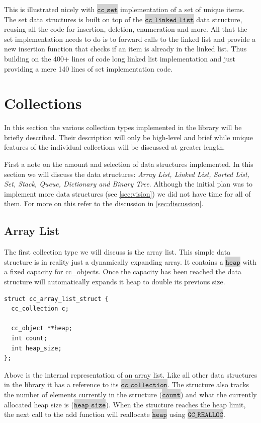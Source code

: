 \documentclass[table]{ituthesis}
\newcommand{\highlight}[1]{\colorbox{lightGray}{$\displaystyle \texttt{#1}$}}
\begin{document}
This is illustrated nicely with \highlight{cc\_set} implementation of a set of unique items. The set data structures is built on top of the \highlight{cc\_linked\_list} data structure, reusing all the code for insertion, deletion, enumeration and more. All that the set implementation needs to do is to forward calls to the linked list and provide a new insertion function that checks if an item is already in the linked list. Thus building on the 400+ lines of code long linked list implementation and just providing a mere 140 lines of set implementation code.

\section{Collections}\label{sec:impl_collections}
	In this section the various collection types implemented in the library will be briefly described. Their description will only be high-level and brief while unique features of the individual collections will be discussed at greater length.

	First a note on the amount and selection of data structures implemented. In this section we will discuss the data structures: \textit{Array List, Linked List, Sorted List, Set, Stack, Queue, Dictionary and Binary Tree}. Although the initial plan was to implement more data structures (see \autoref{sec:vision}) we did not have time for all of them. For more on this refer to the discussion in \autoref{sec:discussion}.

	\subsection{Array List}
	
	The first collection type we will discuss is the array list. This simple data structure is in reality just a dynamically expanding array. It contains a \highlight{heap} with a fixed capacity for cc\_objects. Once the capacity has been reached the data structure will automatically expands it heap to double its previous size.

\begin{lstlisting}[label=cc_array_list-struct,caption=Internal representation of Array List]
struct cc_array_list_struct {
  cc_collection c;

  cc_object **heap;
  int count;
  int heap_size;
};
\end{lstlisting}

	Above is the internal representation of an array list. Like all other data structures in the library it has a reference to its \highlight{cc\_collection}. The structure also tracks the number of elements currently in the structure (\highlight{count}) and what the currently allocated heap size is (\highlight{heap\_size}). When the structure reaches the heap limit, the next call to the add function will reallocate \highlight{heap} using \highlight{GC\_REALLOC}.
\end{document}
